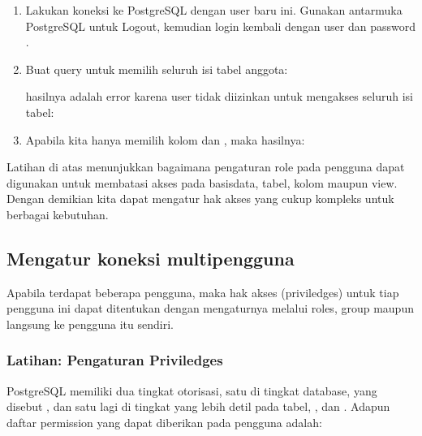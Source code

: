 \documentclass[letterpaper,10pt,english]{sphinxmanual}
\begin{document}
\begin{enumerate}
\item {} 
Lakukan koneksi ke PostgreSQL dengan user baru ini. Gunakan antarmuka PostgreSQL untuk Logout, kemudian login kembali dengan user  dan password .

\item {} 
Buat query untuk memilih seluruh isi tabel anggota:

\begin{sphinxVerbatim}[commandchars=\\\{\}]
    
\end{sphinxVerbatim}

hasilnya adalah error karena user  tidak diizinkan untuk mengakses seluruh isi tabel:


\item {} 
Apabila kita hanya memilih kolom  dan , maka hasilnya:


\end{enumerate}

Latihan di atas menunjukkan bagaimana pengaturan role pada pengguna dapat digunakan untuk membatasi akses pada basisdata, tabel, kolom maupun view. Dengan demikian kita dapat mengatur hak akses yang cukup kompleks untuk berbagai kebutuhan.


\subsection{Mengatur koneksi multi\sphinxhyphen{}pengguna}
\label{\detokenize{sesi2/dbmanagement:mengatur-koneksi-multi-pengguna}}
Apabila terdapat beberapa pengguna, maka hak akses (priviledges) untuk tiap pengguna ini dapat ditentukan dengan mengaturnya melalui roles, group maupun langsung ke pengguna itu sendiri.


\subsubsection{Latihan: Pengaturan Priviledges}
\label{\detokenize{sesi2/dbmanagement:latihan-pengaturan-priviledges}}
PostgreSQL memiliki dua tingkat otorisasi, satu di tingkat database, yang disebut , dan satu lagi di tingkat yang lebih detil pada tabel, , dan .
Adapun daftar permission yang dapat diberikan pada pengguna adalah:
\end{document}
